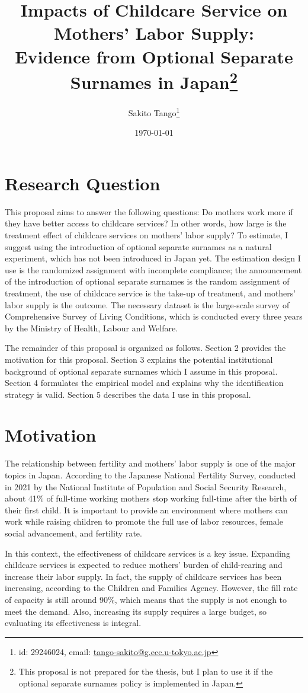 \documentclass[12pt]{article}
\title{Impacts of Childcare Service on Mothers' Labor Supply: \\ 
       Evidence from Optional Separate Surnames in Japan\thanks{
        This proposal is not prepared for the thesis, but I plan to use it if the optional separate surnames policy is implemented in Japan.
       }
       }
\author{Sakito Tango\thanks{id: 29246024, 
        email: \href{mailto:tango-sakito@g.ecc.u-tokyo.ac.jp}{tango-sakito@g.ecc.u-tokyo.ac.jp}
}
}
\date{\today}
\begin{document}
\maketitle

\section{Research Question}
This proposal aims to answer the following questions: Do mothers work more if they have better access to childcare services? 
In other words, how large is the treatment effect of childcare services on mothers' labor supply?
To estimate, I suggest using the introduction of optional separate surnames as a natural experiment, which has not been introduced in Japan yet.
The estimation design I use is the randomized assignment with incomplete compliance; the announcement of the introduction of optional separate surnames is the random assignment of treatment, the use of childcare service is the take-up of treatment, and mothers' labor supply is the outcome.
The necessary dataset is the large-scale survey of Comprehensive Survey of Living Conditions, which is conducted every three years by the Ministry of Health, Labour and Welfare.


The remainder of this proposal is organized as follows. 
Section 2 provides the motivation for this proposal. 
Section 3 explains the potential institutional background of optional separate surnames which I assume in this proposal.
Section 4 formulates the empirical model and explains why the identification strategy is valid.
Section 5 describes the data I use in this proposal.


\section{Motivation}
The relationship between fertility and mothers' labor supply is one of the major topics in Japan. 
According to the Japanese National Fertility Survey, conducted in 2021 by the National Institute of Population and Social Security Research, about 41\%  of full-time working mothers stop working full-time after the birth of their first child.
It is important to provide an environment where mothers can work while raising children to promote the full use of labor resources, female social advancement, and fertility rate.


In this context, the effectiveness of childcare services is a key issue. 
Expanding childcare services is expected to reduce mothers' burden of child-rearing and increase their labor supply.
In fact, the supply of childcare services has been increasing, according to the Children and Families Agency. 
However, the fill rate of capacity is still around 90\%, which means that the supply is not enough to meet the demand.
Also, increasing its supply requires a large budget, so evaluating its effectiveness is integral.
\end{document}

